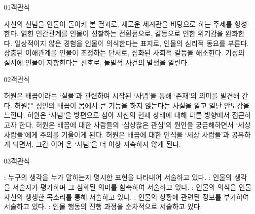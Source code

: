 \documentclass[fs85,seriesWit]{korfarm-base}
\begin{document}

\kfBeginMC
\begin{kfQBlock}{01}{객관식}
\begin{kfChoices}
\kfChoice 자신의 신념을 인물이 돌이켜 본 결과로, 새로운 세계관을 바탕으로 하는 주제를 형성한다.
\kfChoice 얽힌 인간관계를 인물이 성찰하는 전환점으로, 갈등으로 인한 위기감을 완화한다.
\kfChoice 일상적이지 않은 경험을 인물이 의식한다는 표지로, 인물의 심리적 동요를 부른다.
\kfChoice 상충된 이해관계를 인물이 조정하는 단서로, 심화된 사회적 갈등을 해소한다.
\kfChoice 기성의 질서에 인물이 저항한다는 신호로, 돌발적 사건의 발생을 알린다.
\end{kfChoices}
\end{kfQBlock}

\begin{kfQBlock}{02}{객관식}
\begin{kfChoices}
\kfChoice 허원은 배꼽이라는 ‘실물’과 관련하여 시작된 ‘사념’을 통해 ‘존재’의 의미를 발견해 간다.
\kfChoice 허원은 성인의 배꼽이 몸에서 큰 기능을 하지 않는다는 사실을 알고 일단 안도감을 느낀다.
\kfChoice 허원은 ‘사념’을 방편으로 삼아 자신의 현재 상태에 대해 다른 방향에서 접근하고자 한다.
\kfChoice 허원은 배꼽에 대한 사람들의 ‘심상찮은 관심’의 원인을 궁금해하면서 ‘세상 사람들’에게 주의를 기울이게 된다.
\kfChoice 허원은 배꼽에 대한 인식을 ‘세상 사람들’과 공유하게 되면서, 그간 이어 온 ‘사념’을 더 이상 지속하지 않게 된다.
\end{kfChoices}
\end{kfQBlock}

\begin{kfQBlock}{03}{객관식}
\begin{kfChoices}
\kfChoice [가]: 누구의 생각을 누가 말하는지 명시한 표현을 나타내어 서술하고 있다.
\kfChoice [나]: 인물의 생각을 서술자가 평가하며 그 심화된 의미를 함축하여 서술하고 있다.
\kfChoice [다]: 인물의 의식을 인물 자신의 생생한 목소리를 통해 서술하고 있다.
\kfChoice [라]: 인물의 상황에 관련된 정보를 부가하여 서술하고 있다.
\kfChoice [마]: 인물 행동의 진행 과정을 순차적으로 서술하고 있다.
\end{kfChoices}
\end{kfQBlock}
\end{document}
